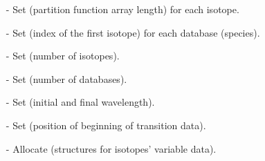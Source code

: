 \documentclass[letterpaper,12pt]{article}
\begin{document}
\begin{enumerate}[leftmargin=10pt, noitemsep, parsep=0pt, topsep=0ex]
\item[-] Set  (partition function array length) for each isotope.
\item[-] Set  (index of the first isotope) for each database (species).
\item[-] Set  (number of isotopes).
\item[-] Set  (number of databases).
\item[-] Set  (initial and final wavelength).
\item[-] Set  (position of beginning of transition data).
\item[-] Allocate  (structures for isotopes' variable data).
\end{enumerate}
\end{document}
